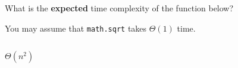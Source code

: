 \begin{prob}
    What is the \textbf{expected} time complexity of the function below?

    You may assume that \texttt{math.sqrt} takes $\Theta(1)$
    time.

    \inputminted{python}{./code.py}

    \begin{soln}
        $\Theta(n^2)$
    \end{soln}

\end{prob}
